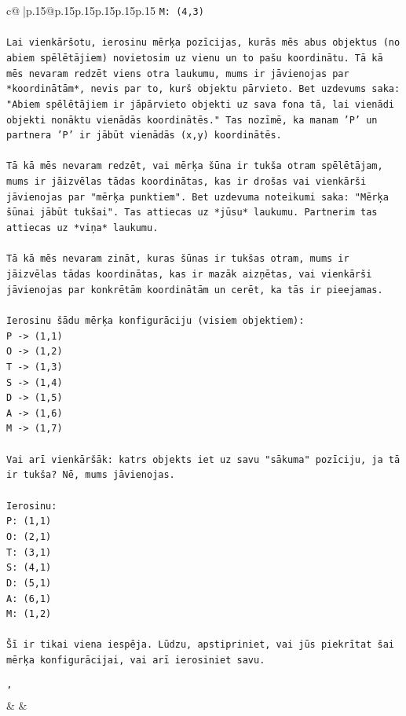 \documentclass{article}
\begin{document}
{\begin{supertabular}{c@{$\;$}|p{.15\linewidth}@{}p{.15\linewidth}p{.15\linewidth}p{.15\linewidth}p{.15\linewidth}p{.15\linewidth}}
{{{\texttt{M: (4,3)} \\
\\ 
\texttt{Lai vienkāršotu, ierosinu mērķa pozīcijas, kurās mēs abus objektus (no abiem spēlētājiem) novietosim uz vienu un to pašu koordinātu. Tā kā mēs nevaram redzēt viens otra laukumu, mums ir jāvienojas par *koordinātām*, nevis par to, kurš objektu pārvieto. Bet uzdevums saka: "Abiem spēlētājiem ir jāpārvieto objekti uz sava fona tā, lai vienādi objekti nonāktu vienādās koordinātēs." Tas nozīmē, ka manam 'P' un partnera 'P' ir jābūt vienādās (x,y) koordinātēs.} \\
\\ 
\texttt{Tā kā mēs nevaram redzēt, vai mērķa šūna ir tukša otram spēlētājam, mums ir jāizvēlas tādas koordinātas, kas ir drošas vai vienkārši jāvienojas par "mērķa punktiem". Bet uzdevuma noteikumi saka: "Mērķa šūnai jābūt tukšai". Tas attiecas uz *jūsu* laukumu. Partnerim tas attiecas uz *viņa* laukumu.} \\
\\ 
\texttt{Tā kā mēs nevaram zināt, kuras šūnas ir tukšas otram, mums ir jāizvēlas tādas koordinātas, kas ir mazāk aizņētas, vai vienkārši jāvienojas par konkrētām koordinātām un cerēt, ka tās ir pieejamas.} \\
\\ 
\texttt{Ierosinu šādu mērķa konfigurāciju (visiem objektiem):} \\
\texttt{P {-}> (1,1)} \\
\texttt{O {-}> (1,2)} \\
\texttt{T {-}> (1,3)} \\
\texttt{S {-}> (1,4)} \\
\texttt{D {-}> (1,5)} \\
\texttt{A {-}> (1,6)} \\
\texttt{M {-}> (1,7)} \\
\\ 
\texttt{Vai arī vienkāršāk: katrs objekts iet uz savu "sākuma" pozīciju, ja tā ir tukša? Nē, mums jāvienojas.} \\
\\ 
\texttt{Ierosinu:} \\
\texttt{P: (1,1)} \\
\texttt{O: (2,1)} \\
\texttt{T: (3,1)} \\
\texttt{S: (4,1)} \\
\texttt{D: (5,1)} \\
\texttt{A: (6,1)} \\
\texttt{M: (1,2)} \\
\\ 
\texttt{Šī ir tikai viena iespēja. Lūdzu, apstipriniet, vai jūs piekrītat šai mērķa konfigurācijai, vai arī ierosiniet savu.} \\
\\ 
\texttt{'} \\
            }
        }
    }
    & & \\ \\


\end{supertabular}}
\end{document}
